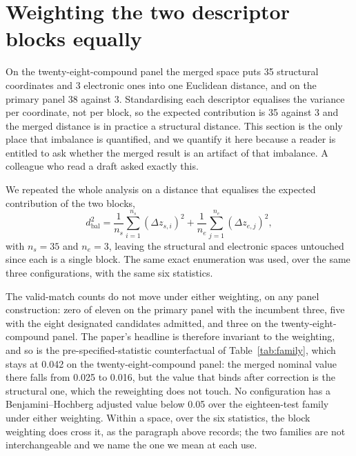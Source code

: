 \documentclass[11pt,a4paper]{article}
\begin{document}
\section{Weighting the two descriptor blocks equally}
\label{res:blockbalance}

On the twenty-eight-compound panel the merged space puts 35 structural
coordinates and 3 electronic ones into one Euclidean distance, and on the
primary panel 38 against 3. Standardising each descriptor equalises the variance per
coordinate, not per block, so the expected contribution is 35 against 3 and the
merged distance is in practice a structural distance. This section is the only
place that imbalance is quantified, and we quantify it here because a reader is entitled to ask whether the merged
result is an artifact of that imbalance. A colleague who read a draft asked
exactly this.

We repeated the whole analysis on a distance that equalises the expected
contribution of the two blocks,
\begin{equation}
d_{\mathrm{bal}}^{2}=\frac{1}{n_{s}}\sum_{i=1}^{n_{s}}(\Delta z_{s,i})^{2}
 +\frac{1}{n_{e}}\sum_{j=1}^{n_{e}}(\Delta z_{e,j})^{2},
\end{equation}
with $n_{s}=35$ and $n_{e}=3$, leaving the structural and electronic spaces
untouched since each is a single block. The same exact enumeration was used, over
the same three configurations, with the same six statistics.

\begin{table}[!htb]
\centering
\caption{Equal weight per descriptor against equal weight per block, in the
merged space. Valid-match counts are identical under the two weightings on
every panel construction. The smallest $p$ is taken over the eighteen-test
family of three spaces by six statistics, and $q$ is the
Benjamini--Hochberg adjusted value of that family.}
\label{tab:blockbalance}
\small

\end{table}

The valid-match counts do not move under either weighting, on any panel
construction: zero of eleven on the primary panel with the incumbent three,
five with the eight designated candidates admitted, and three on the
twenty-eight-compound panel. The paper's headline is therefore invariant to
the weighting, and
so is the pre-specified-statistic counterfactual of Table~\ref{tab:family},
which stays at 0.042 on the twenty-eight-compound panel: the merged nominal value
there falls from 0.025 to 0.016, but the value that binds after correction is the
structural one, which the reweighting does not touch. No configuration has a
Benjamini--Hochberg adjusted value below 0.05 over the eighteen-test family
under either weighting. Within a space, over the six statistics, the block
weighting does cross it, as the paragraph above records; the two families are
not interchangeable and we name the one we mean at each use.
\end{document}
